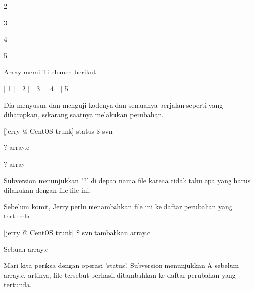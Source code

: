 \noindent 
 \hspace*{0.5in}  \hspace*{0.5in} 2 \par
\noindent 
 \hspace*{0.5in}  \hspace*{0.5in} 3 \par
\noindent 
 \hspace*{0.5in}  \hspace*{0.5in} 4 \par
\noindent 
 \hspace*{0.5in}  \hspace*{0.5in} 5 \par
\noindent 
 \hspace*{0.5in} Array memiliki elemen berikut \par
\noindent 
 \hspace*{0.5in}  \hspace*{0.5in}  $  \vert  $ 1  $  \vert  $  $  \vert  $ 2  $  \vert  $  $  \vert  $ 3  $  \vert  $  $  \vert  $ 4  $  \vert  $  $  \vert  $ 5  $  \vert  $ \par
\vspace{12pt}
\noindent 
Dia menyusun dan menguji kodenya dan semuanya berjalan seperti yang diharapkan, sekarang saatnya melakukan perubahan. \par
\noindent 
 \hspace*{0.5in} [jerry @ CentOS trunk] status  $  \$  $ svn \par
\noindent 
 \hspace*{0.5in} ? array.c \par
\noindent 
 \hspace*{0.5in} ? array \par
\noindent 
Subversion menunjukkan '?' di depan nama file karena tidak tahu apa yang harus dilakukan dengan file-file ini. \par
\noindent 
Sebelum komit, Jerry perlu menambahkan file ini ke daftar perubahan yang tertunda. \par
\noindent 
 \hspace*{0.5in} [jerry @ CentOS trunk]  $  \$  $ svn tambahkan array.c \par
\noindent 
 \hspace*{0.5in} Sebuah array.c \par
\noindent 
Mari kita periksa dengan operasi 'status'. Subversion menunjukkan A sebelum array.c, artinya, file tersebut berhasil ditambahkan ke daftar perubahan yang tertunda. \par
\noindent 
